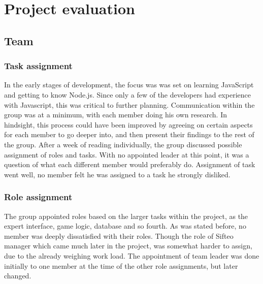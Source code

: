 \chapter{Project evaluation}

\section{Team}

\subsection*{Task assignment}

In the early stages of development, the focus was was set on learning JavaScript and getting to know Node.js. Since only a few of the developers had experience with Javascript, this was critical to further planning. Communication within the group was at a minimum, with each member doing his own research. In hindsight, this process could have been improved by agreeing on certain aspects for each member to go deeper into, and then present their findings to the rest of the group. After a week of reading individually, the group discussed possible assignment of roles and tasks. With no appointed leader at this point, it was a question of what each different member would preferably do. Assignment of task went well, no member felt he was assigned to a task he strongly disliked.


\subsection*{Role assignment}

The group appointed roles based on the larger tasks within the project, as the expert interface, game logic, database and so fourth. As was stated before, no member was deeply dissatisfied with their roles. Though the role of Sifteo manager which came much later in the project, was somewhat harder to assign, due to the already weighing work load. The appointment of team leader was done initially to one member at the time of the other role assignments, but later changed. 

